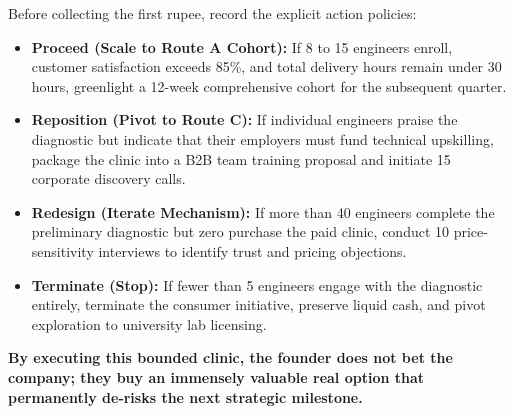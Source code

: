 Before collecting the first rupee, record the explicit action policies:
\begin{itemize}[leftmargin=10pt,itemsep=1pt,topsep=1pt]
  \item \textbf{Proceed (Scale to Route A Cohort):} If 8 to 15 engineers enroll, customer satisfaction exceeds 85\%, and total delivery hours remain under 30 hours, greenlight a 12-week comprehensive cohort for the subsequent quarter.
  \item \textbf{Reposition (Pivot to Route C):} If individual engineers praise the diagnostic but indicate that their employers must fund technical upskilling, package the clinic into a B2B team training proposal and initiate 15 corporate discovery calls.
  \item \textbf{Redesign (Iterate Mechanism):} If more than 40 engineers complete the preliminary diagnostic but zero purchase the paid clinic, conduct 10 price-sensitivity interviews to identify trust and pricing objections.
  \item \textbf{Terminate (Stop):} If fewer than 5 engineers engage with the diagnostic entirely, terminate the consumer initiative, preserve liquid cash, and pivot exploration to university lab licensing.
\end{itemize}

\textbf{By executing this bounded clinic, the founder does not bet the company; they buy an immensely valuable real option that permanently de-risks the next strategic milestone.}
